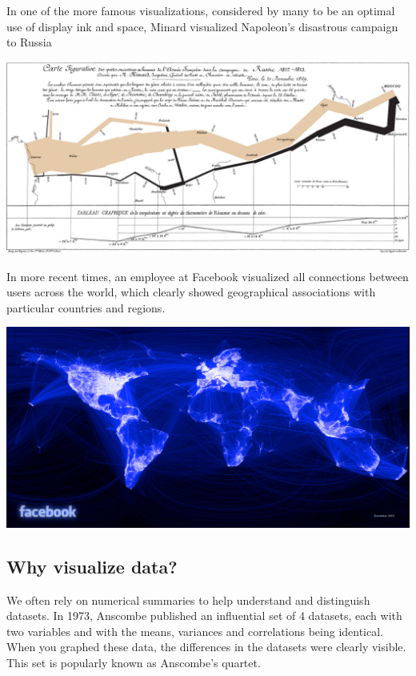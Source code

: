 \documentclass[
  letterpaper,
]{scrbook}
\begin{document}
In one of the more famous visualizations, considered by many to be an optimal use of display ink and space, Minard visualized Napoleon's disastrous campaign to Russia

\includegraphics{graphs/map-full-size1.png}

In more recent times, an employee at Facebook visualized all connections between users across the world, which clearly showed geographical associations with particular countries and regions.

\includegraphics{graphs/facebook-high-res-friendship-world-map-paul-butler.png}

\hypertarget{why-visualize-data}{%
\subsection{Why visualize data?}\label{why-visualize-data}}

We often rely on numerical summaries to help understand and distinguish datasets. In 1973, Anscombe published an influential set of 4 datasets, each with two variables and with the means, variances and correlations being identical. When you graphed these data, the differences in the datasets were clearly visible. This set is popularly known as Anscombe's quartet.
\end{document}
